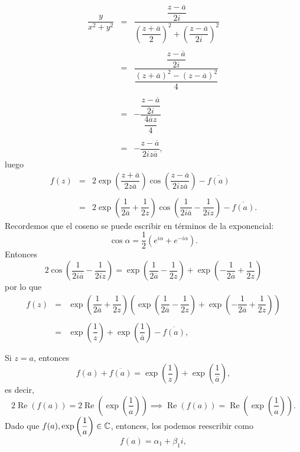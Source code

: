 \begin{Ejem}
			\[
			\begin{array}{ccl}
			\dfrac{y}{x^2+y^2}&=&\dfrac{\dfrac{z-\overline{a}}{2i}}{\left(\dfrac{z+\overline{a}}{2}\right)^2+\left(\dfrac{z-\overline{a}}{2i}\right)^2}\\\\
			&=&\dfrac{\dfrac{z-\overline{a}}{2i}}{\dfrac{(z+\overline{a})^2-(z-\overline{a})^2}{4}}\\\\
			&=&-\dfrac{\dfrac{z-\overline{a}}{2i}}{\dfrac{4\overline{a}z}{4}}\\\\
			&=&-\dfrac{z-\overline{a}}{2iz\overline{a}},
		\end{array}
	\]
	luego
	\[
		\begin{array}{ccl}
			f(z)&=&2\exp\left({\dfrac{z+\overline{a}}{2z\overline{a}}}\right)\cos\left(\dfrac{z-\overline{a}}{2iz\overline{a}}  \right)-\overline{f(a)}\\\\
			&=&2\exp\left({\dfrac{1}{2\overline{a}}+\dfrac{1}{2z}}\right)\cos\left(\dfrac{1}{2i\overline{a}}-\dfrac{1}{2iz}\right)-\overline{f(a)}.
				\end{array}
			\]
			Recordemos que el coseno se puede escribir en términos de la exponencial:
			$$\cos\alpha=\dfrac{1}{2}\left(e^{i\alpha}+e^{-i\alpha}\right).$$
			Entonces
			$$2\cos\left(\dfrac{1}{2i\overline{a}}-\dfrac{1}{2iz}\right)=\exp\left(\dfrac{1}{2\overline{a}}-\dfrac{1}{2z}\right)+\exp\left(-\dfrac{1}{2\overline{a}}+\dfrac{1}{2z}\right)$$
			por lo que 
			\[
			\begin{array}{ccl}
			f(z)&=&\exp\left({\dfrac{1}{2\overline{a}}+\dfrac{1}{2z}}\right)\left(\exp\left(\dfrac{1}{2\overline{a}}-\dfrac{1}{2z}\right)+\exp\left(-\dfrac{1}{2\overline{a}}+\dfrac{1}{2z}\right)\right)\\\\
			&=&\exp\left({\dfrac{1}{z}}\right)+\exp\left({\dfrac{1}{\overline{a}}}\right)-\overline{f(a)},\\\\
		\end{array}
	\]
	Si $z=a$, entonces $$f(a)+\overline{f(a)}=\exp\left({\dfrac{1}{z}}\right)+\exp\left({\dfrac{1}{\overline{a}}}\right),$$ es decir, $$2\operatorname{Re} (f(a))=2\operatorname{Re }\left(\exp\left(\dfrac{1}{a}\right)\right)\implies \operatorname{Re }(f(a))=\operatorname{Re }\left(\exp\left(\dfrac{1}{a}\right)\right).$$
	Dado que $f(a),\exp\left(\dfrac{1}{a}\right)\in \mathbb{C}$, entonces, los podemos reescribir como 
	$$f(a)=\alpha_1+\beta_1 i,$$

\end{Ejem}

